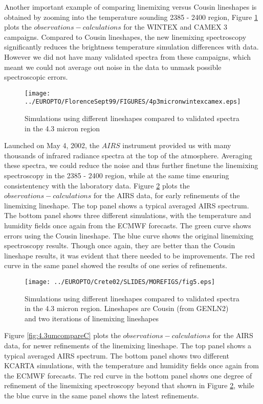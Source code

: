 \documentclass[11pt]{article}
\begin{document}
Another important example of comparing linemixing versus Cousin lineshapes
is obtained by zooming into the 
temperature sounding 2385 - 2400 \wn region,  Figure \ref{fig:4.3umcompareA} 
plots the  $observations - calculations$ for the \textsf{WINTEX} and 
\textsf{CAMEX 3} campaigns. Compared to Cousin lineshapes, the new linemixing 
spectroscopy significantly reduces the brightness temperature simulation 
differences with data. However we did not have many validated spectra from 
these campaigns, which meant we could not average out noise in the data to 
unmask possible spectroscopic errors.

\begin{figure}
\texttt{[image: ../EUROPTO/FlorenceSept99/FIGURES/4p3micronwintexcamex.eps]}
  \caption{Simulations using different lineshapes compared to validated 
           spectra in the 4.3 micron region}
  \label{fig:4.3umcompareA} 
\end{figure} 

Launched on May 4, 2002, the $AIRS$ instrument provided us with many 
thousands of infrared radiance spectra at the top of the atmosphere. Averaging
these spectra, we could reduce the noise and thus further finetune the \cd 
linemixing spectroscopy in the 2385 - 2400 \wn region, while at the same time
ensuring consistentency with the laboratory data. 
Figure \ref{fig:4.3umcompareB}
plots the  $observations - calculations$ for the \textsf{AIRS} data, for early
refinements of the linemixing lineshape. The top 
panel shows a typical averaged AIRS spectrum. The bottom panel shows three  
different simulations, with the temperature and humidity fields once 
again from the ECMWF forecasts. The green curve shows errors using the Cousin
lineshape. The blue curve shows the original linemixing spectroscopy results.
Though once again, they are better than the Cousin lineshape results, it was
evident that there needed to be improvements. The red curve in the same 
panel showed the results of one series of refinements. 

\begin{figure}
\texttt{[image: ../EUROPTO/Crete02/SLIDES/MOREFIGS/fig5.eps]}
  \caption{Simulations using different lineshapes compared to validated 
           spectra in the 4.3 micron region. Lineshapes are Cousin (from 
           GENLN2) and two iterations of linemixing lineshapes}
  \label{fig:4.3umcompareB} 
\end{figure} 

Figure \ref{fig:4.3umcompareC}
plots the  $observations - calculations$ for the \textsf{AIRS} data, for
newer refinements of the linemixing lineshape. The top 
panel shows a typical averaged AIRS spectrum. The bottom panel shows two 
different KCARTA simulations, with the temperature and humidity fields once 
again from the ECMWF forecasts. The red curve in the bottom 
panel shows one degree of refinement of the linemixing spectroscopy beyond that
shown in Figure \ref{fig:4.3umcompareB}, while the blue curve in the same 
panel shows the latest refinements. 
\end{document}
